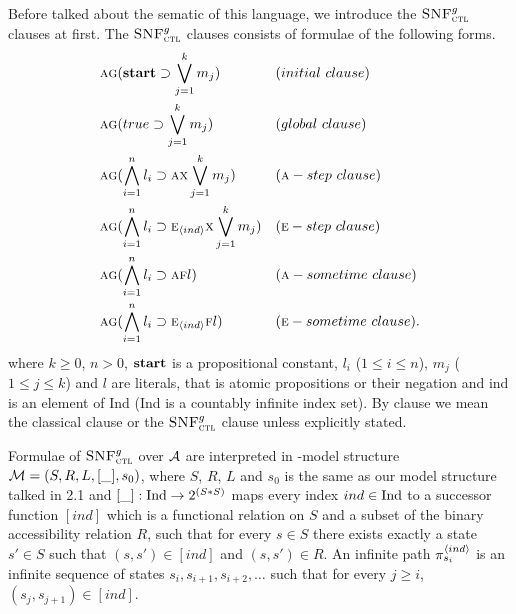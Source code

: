 \documentclass[letterpaper]{article} %
\begin{document}
Before talked about the sematic of this language, we introduce the ${\textsc{SNF}_{\textsc{ctl}}^g}$ clauses at first. The ${\textsc{SNF}_{\textsc{ctl}}^g}$ clauses consists of formulae of the following forms.
\begin{align*}
& \ALL \GLOBAL(\start \supset \bigvee_{j=1}^k m_j) && (initial\ clause) \\
& \ALL \GLOBAL(true \supset \bigvee_{j=1}^k m_j) && (global\ clause) \\
& \ALL \GLOBAL(\bigwedge_{i=1}^n l_i \supset \ALL \NEXT \bigvee_{j=1}^k m_j) && (\ALL-step\ clause)\\
& \ALL \GLOBAL(\bigwedge_{i=1}^n l_i \supset \EXIST_\tuple{ind} \NEXT \bigvee_{j=1}^k m_j) && (\EXIST-step\ clause)\\
& \ALL \GLOBAL(\bigwedge_{i=1}^n l_i \supset \ALL \FUTURE l) && (\ALL-sometime\ clause)\\
& \ALL \GLOBAL(\bigwedge_{i=1}^n l_i \supset \EXIST_{\tuple{ind}} \FUTURE l) && (\EXIST-sometime\ clause).
\end{align*}
where $k \ge 0$, $n > 0$, $\textbf{start}$ is a propositional constant, $l_i$ ($1 \le i \le n$), $m_j$ ($1 \le j \le k$) and $l$ are literals, that is atomic propositions or their negation and ind is an element of Ind (Ind is a countably infinite index set). By clause we mean the classical clause or the ${\textsc{SNF}_{\textsc{ctl}}^g}$ clause unless explicitly stated.

Formulae of ${\textsc{SNF}_{\textsc{ctl}}^g}$ over ${\cal A}$ are interpreted in \Ind-model structure ${\cal M}=(S,R,L, [\_], s_0)$, where $S$, $R$, $L$ and $s_0$ is the same as our model structure talked in 2.1 and $[\_]: \textrm{Ind} \rightarrow 2^{(S*S)}$ maps every index $ind \in \textrm{Ind}$ to a successor function $[ind]$ which is a functional relation on $S$ and a subset of the binary accessibility relation $R$, such that for every $s\in S$ there exists exactly a state $s'\in S$ such that $(s,s')\in [ind]$ and $(s,s')\in R$.
An infinite path $\pi_{s_i}^{{\langle{ind}\rangle}}$ is an infinite sequence of states $s_i, s_{i+1}, s_{i+2},\dots$ such that for every $j\geq i$, $(s_j, s_{j+1})\in [ind]$.
\end{document}
